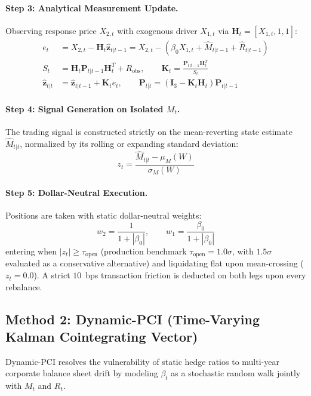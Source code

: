 \documentclass[11pt, a4paper]{article}
\begin{document}
\paragraph{Step 3: Analytical Measurement Update.}
Observing response price $X_{2,t}$ with exogenous driver $X_{1,t}$ via $\mathbf{H}_t = [X_{1,t}, 1, 1]$:
\begin{align}
    e_t &= X_{2,t} - \mathbf{H}_t \hat{\mathbf{z}}_{t|t-1} = X_{2,t} - (\beta_0 X_{1,t} + \hat{M}_{t|t-1} + \hat{R}_{t|t-1}) \\
    S_t &= \mathbf{H}_t \mathbf{P}_{t|t-1} \mathbf{H}_t^T + R_{\text{obs}}, \qquad \mathbf{K}_t = \frac{\mathbf{P}_{t|t-1}\mathbf{H}_t^T}{S_t} \\
    \hat{\mathbf{z}}_{t|t} &= \hat{\mathbf{z}}_{t|t-1} + \mathbf{K}_t e_t, \qquad \mathbf{P}_{t|t} = (\mathbf{I}_3 - \mathbf{K}_t \mathbf{H}_t) \mathbf{P}_{t|t-1}
\end{align}

\paragraph{Step 4: Signal Generation on Isolated $M_t$.}
The trading signal is constructed strictly on the mean-reverting state estimate $\hat{M}_{t|t}$, normalized by its rolling or expanding standard deviation:
\begin{equation}
    z_t = \frac{\hat{M}_{t|t} - \mu_M(W)}{\sigma_M(W)}
\end{equation}

\paragraph{Step 5: Dollar-Neutral Execution.}
Positions are taken with static dollar-neutral weights:
\begin{equation}
    w_{2} = \frac{1}{1 + |\beta_0|}, \qquad w_{1} = \frac{\beta_0}{1 + |\beta_0|}
\end{equation}
entering when $|z_t| \ge \tau_{\text{open}}$ (production benchmark $\tau_{\text{open}} = 1.0\sigma$, with $1.5\sigma$ evaluated as a conservative alternative) and liquidating flat upon mean-crossing ($z_t = 0.0$). A strict $10$~bps transaction friction is deducted on both legs upon every rebalance.

\subsection{Method 2: Dynamic-PCI (Time-Varying Kalman Cointegrating Vector)}
\label{sec:method_dynamic}
Dynamic-PCI resolves the vulnerability of static hedge ratios to multi-year corporate balance sheet drift by modeling $\beta_t$ as a stochastic random walk jointly with $M_t$ and $R_t$.
\end{document}
